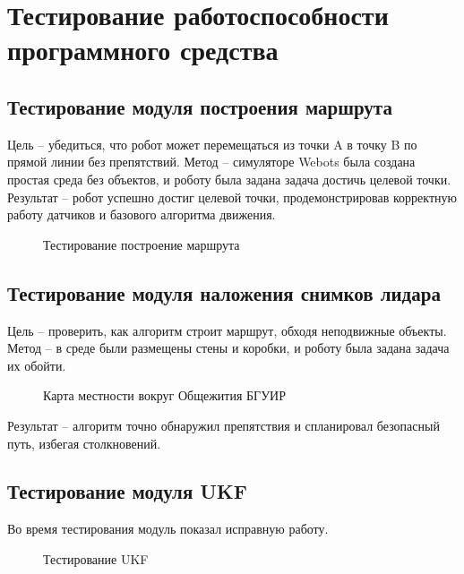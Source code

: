 \section{Тестирование работоспособности программного средства}

\subsection{Тестирование модуля построения маршрута}

Цель -- убедиться, что робот может перемещаться из точки A в точку B по прямой
линии без препятствий.
Метод -- симуляторе Webots была создана простая среда без
объектов, и роботу была задана задача достичь целевой точки.
Результат -- робот успешно достиг целевой точки, продемонстрировав корректную
работу датчиков и базового алгоритма движения.

\FloatBarrier
\begin{figure}[h]
\centering
\caption{Тестирование построение маршрута}
\end{figure}
\FloatBarrier

\subsection{Тестирование модуля наложения снимков лидара}

Цель -- проверить, как алгоритм строит маршрут, обходя неподвижные объекты.
Метод -- в среде были размещены стены и коробки, и роботу была задана задача их
обойти.

\FloatBarrier
\begin{figure}[h]
\centering
\caption{Карта местности вокруг Общежития  БГУИР}
\end{figure}
\FloatBarrier

Результат -- алгоритм точно обнаружил препятствия и спланировал
безопасный путь, избегая столкновений.

\subsection{Тестирование модуля UKF}

Во время тестирования модуль показал исправную работу.

\FloatBarrier
\begin{figure}[h]
\centering
\caption{Тестирование UKF}
\end{figure}
\FloatBarrier

